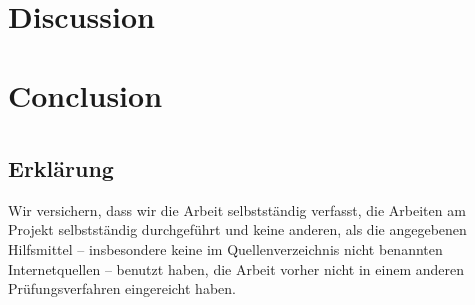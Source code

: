 \documentclass[
	12pt,
	a4paper,
	BCOR10mm,
	DIV14,
	listof=totoc,
	bibliography=totoc,
	headsepline
]{scrreprt}
\begin{document}
	
\chapter{Discussion}
\label{Discussion}


\chapter{Conclusion}
\label{Conclusion}

\nocite{*}



\listoffigures

\listoftables

\lstlistoflistings

\newpage

\thispagestyle{empty}

\chapter*{}

\section*{Erklärung}

Wir versichern, dass wir die Arbeit selbstständig verfasst, die Arbeiten am Projekt selbstständig durchgeführt und keine anderen, als die angegebenen Hilfsmittel -- insbesondere keine im Quellenverzeichnis nicht benannten Internetquellen -- benutzt haben, die Arbeit vorher nicht in einem anderen Prüfungsverfahren eingereicht haben.

\smallskip

\bigskip
\bigskip
\bigskip

\end{document}
